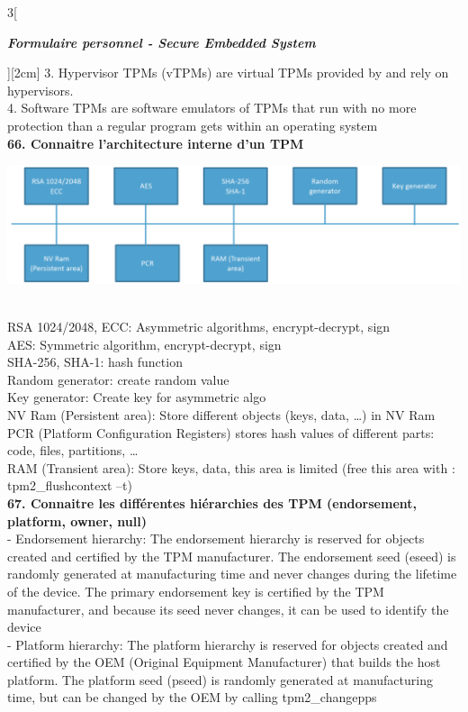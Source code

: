 \begin{multicols}{3}[\centerline{ \large\em \textbf{Formulaire personnel - Secure Embedded System}}][2cm]
3. Hypervisor TPMs (vTPMs) are virtual TPMs provided by and rely on hypervisors.\\
4. Software TPMs are software emulators of TPMs that run with no more protection than a regular program gets within an operating system
\\ \textbf{66. Connaitre l’architecture interne d’un TPM\\}
\begin{minipage}{\linewidth}
	\centering
    \includegraphics[width =0.8\columnwidth]{images/47.png}
\end{minipage}\\
RSA 1024/2048, ECC: Asymmetric algorithms, encrypt-decrypt, sign\\
AES: Symmetric algorithm, encrypt-decrypt, sign\\
SHA-256, SHA-1: hash function\\
Random generator: create random value\\
Key generator: Create key for asymmetric algo\\
NV Ram (Persistent area): Store different objects (keys, data, …) in NV Ram\\
PCR (Platform Configuration Registers) stores hash values of different parts: code, files, partitions, …\\
RAM (Transient area): Store keys, data, this area is limited (free this area with : tpm2\_flushcontext –t)
\\ \textbf{67. Connaitre les différentes hiérarchies des TPM (endorsement, platform, owner, null)\\}
- Endorsement hierarchy: The endorsement hierarchy is reserved for objects created and certified by the TPM manufacturer. The endorsement seed (eseed) is randomly generated at manufacturing
time and never changes during the lifetime of the device. The primary endorsement key is certified by the TPM manufacturer, and because its seed never changes, it can be used to identify the device\\
- Platform hierarchy: The platform hierarchy is reserved for objects created and certified by the OEM (Original Equipment Manufacturer) that builds the host platform. The platform seed (pseed) is randomly generated at manufacturing time, but can be changed by the OEM by calling tpm2\_changepps\\

\end{multicols}
